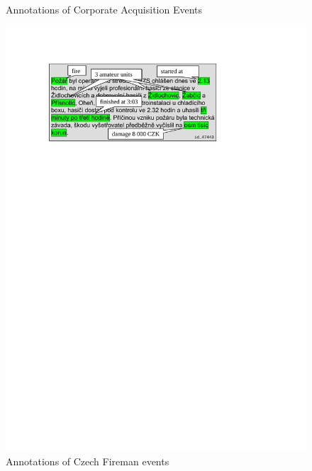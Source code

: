 \documentclass[12pt,a4paper,twoside,notitlepage]{article}
\begin{document}
\begin{figure}[p]
\centering
{}
\caption{Annotations of Corporate Acquisition Events}
\label{fig:acquisitions_annotated}
\end{figure}


\begin{figure}[p]
\centering
\includegraphics[width=0.65\hsize]{fireman_annotated}
\caption{Annotations of Czech Fireman events}
\label{fig:fireman_annotated}
\end{figure}
\end{document}
